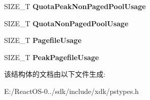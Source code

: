 \begin{DoxyCompactItemize}
S\+I\+Z\+E\+\_\+T {\bfseries Quota\+Peak\+Non\+Paged\+Pool\+Usage}
\item 
\mbox{\label{struct___v_m___c_o_u_n_t_e_r_s_ae45ae00533e6239a58efff7e1af5f930}} 
S\+I\+Z\+E\+\_\+T {\bfseries Quota\+Non\+Paged\+Pool\+Usage}
\item 
\mbox{\label{struct___v_m___c_o_u_n_t_e_r_s_af959c3245f51be7d41a36d393f19afb5}} 
S\+I\+Z\+E\+\_\+T {\bfseries Pagefile\+Usage}
\item 
\mbox{\label{struct___v_m___c_o_u_n_t_e_r_s_a25876b871adbdf1e965660abdcd3dd6b}} 
S\+I\+Z\+E\+\_\+T {\bfseries Peak\+Pagefile\+Usage}
\end{DoxyCompactItemize}


该结构体的文档由以下文件生成\+:\begin{DoxyCompactItemize}
\item 
E\+:/\+React\+O\+S-\/0../sdk/include/xdk/pstypes.\+h\end{DoxyCompactItemize}
